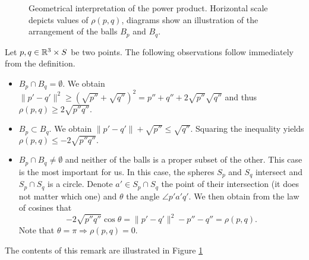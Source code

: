 \begin{figure}
{
}
\caption{Geometrical interpretation of the power product. Horizontal scale depicts values of $\rho(p,q)$, diagrams show an illustration of the arrangement of the balls $B_p$ and $B_q$. }
\label{fig:powerproduct}
\end{figure}





\begin{remark}
Let $p,q \in {\mathbb R^3}\times S$ be two points. The following observations follow immediately from the definition. 
\begin{itemize}
	\item $B_p\cap B_q = \emptyset$. We obtain $\|p'-q'\|^2 \geq (\sqrt{p''} + \sqrt{q''})^2 = p'' + q'' + 2\sqrt{p''}\sqrt{q''}$ and thus $\rho(p,q) \geq 2\sqrt{p'' q''}.$ 
	\item $B_p \subset B_q$. We obtain $\|p'-q'\| + \sqrt{p''} \leq \sqrt{q''} $. Squaring the inequality yields $\rho(p,q) \leq -2\sqrt{p'' q''}.$ 
	\item $B_p \cap B_q \neq \emptyset$ and neither of the balls is a proper subset of the other. This case is the most important for us. In this case, the spheres $S_p$ and $S_q$ intersect and $S_p\cap S_q$ is a circle. Denote $a' \in S_p \cap S_q$ the point of their intersection (it does not matter which one) and $\theta$ the angle $\angle p'a'q'$. We then obtain from the law of cosines that 
		$$- 2\sqrt{p'' q''}\cos \theta = \|p'-q'\|^2 - p'' - q'' = \rho(p,q).$$
	Note that $\theta = \pi \Rightarrow \rho(p,q)=0$.
\end{itemize}
The contents of this remark are illustrated in Figure \ref{fig:powerproduct}
\end{remark}

